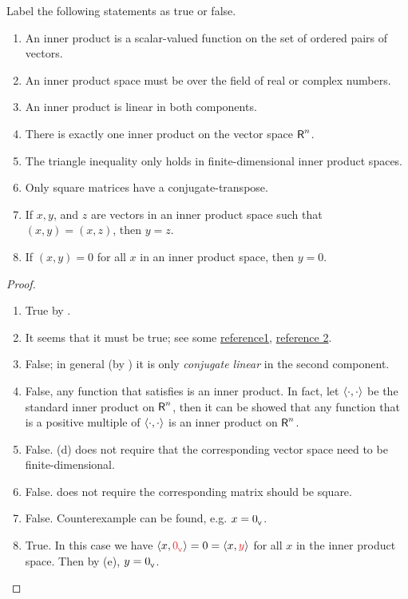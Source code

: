 \exercisesection

\begin{exercise} \label{exercise 6.1.1}
Label the following statements as true or false.
\begin{enumerate}
\item An inner product is a scalar-valued function on the set of ordered pairs of vectors.
\item An inner product space must be over the field of real or complex numbers.
\item An inner product is linear in both components.
\item There is exactly one inner product on the vector space \(\textsf{R}^n\).
\item The triangle inequality only holds in finite-dimensional inner product spaces.
\item Only square matrices have a conjugate-transpose.
\item If \(x, y\), and \(z\) are vectors in an inner product space such that \((x, y) = (x, z)\), then \(y = z\).
\item If \((x, y) = 0\) for all \(x\) in an inner product space, then \(y = 0\).
\end{enumerate}
\end{exercise}

\begin{proof} \ 

\begin{enumerate}
\item True by .
\item It seems that it must be true; see some \href{https://math.stackexchange.com/questions/49348/inner-product-spaces-over-finite-fields}{reference1},
\href{https://mathoverflow.net/questions/129413/what-fields-can-be-used-for-an-inner-product-space}{reference 2}.

\item False; in general (by ) it is only \emph{conjugate linear} in the second component.
\item False, any function that satisfies  is an inner product.
In fact, let \(\left< \cdot, \cdot \right>\) be the standard inner product on \(\textsf{R}^n\), then it can be showed that any function that is a positive multiple of \(\left< \cdot, \cdot \right>\) is an inner product on \(\textsf{R}^n\).

\item False. (d) does not require that the corresponding vector space need to be finite-dimensional.

\item False.  does not require the corresponding matrix should be square.
\item False. Counterexample can be found, e.g. \(x = 0_{_{\textsf{V}}}\).
\item True. In this case we have \(\LG x, \RED{\OV} \RG = 0 = \LG x, \RED{y} \RG\) for all \(x\) in the inner product space.
Then by (e), \(y = 0_{_{\textsf{V}}}\).
\end{enumerate}
\end{proof}

